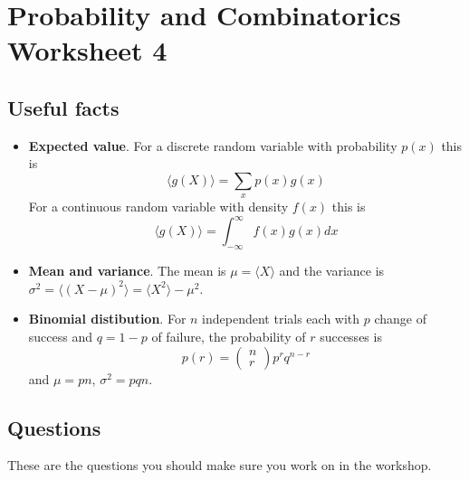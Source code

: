 \documentclass[11pt,a4paper]{scrartcl}
\begin{document}
\section*{Probability and Combinatorics Worksheet 4}

\subsection*{Useful facts}

\begin{itemize}

\item \textbf{Expected value}. For a discrete random variable with probability $p(x)$ this is
\begin{equation}
\langle g(X) \rangle = \sum_x p(x)g(x)
\end{equation}
For a continuous random variable with density $f(x)$ this is
\begin{equation}
\langle g(X)\rangle = \int_{-\infty}^\infty{f(x)g(x)}dx
\end{equation}


\item \textbf{Mean and variance}. The mean is $\mu=\langle X\rangle$ and the variance is $\sigma^2=\langle(X-\mu)^2\rangle=\langle X^2\rangle - \mu^2$.

\item \textbf{Binomial distibution}. For $n$ independent trials each with $p$ change of success and $q=1-p$ of failure, the probability of $r$ successes is 
\begin{equation}
p(r)=\left(\begin{array}{c}n\\r\end{array}\right)p^rq^{n-r}
\end{equation}
and $\mu=pn$, $\sigma^2=pqn$.

\end{itemize}



\subsection*{Questions}

These are the questions you should make sure you work on in the workshop.
\end{document}
